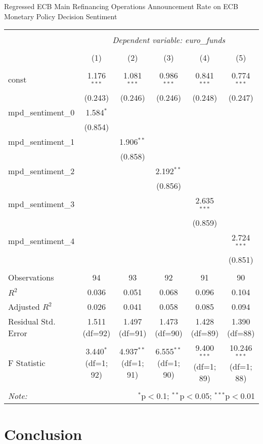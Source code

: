 \documentclass[12pt, letterpaper]{article}
\begin{document}
 Regressed ECB Main Refinancing Operations Announcement Rate on ECB Monetary Policy Decision Sentiment

\begin{table}[H] 
\begin{adjustbox}{width=\textwidth}
\centering
\begin{tabular}{@{\extracolsep{5pt}}lccccc}
\\[-1.8ex]\hline
\hline \\[-1.8ex]
& \multicolumn{5}{c}{\textit{Dependent variable: euro\_funds}} \\
\cline{2-6}
\\[-1.8ex] & (1) & (2) & (3) & (4) & (5) \\
\hline \\[-1.8ex]
const & 1.176$^{***}$ & 1.081$^{***}$ & 0.986$^{***}$ & 0.841$^{***}$ & 0.774$^{***}$ \\
& (0.243) & (0.246) & (0.246) & (0.248) & (0.247) \\
mpd\_sentiment\_0 & 1.584$^{*}$ & & & & \\
& (0.854) & & & & \\
mpd\_sentiment\_1 & & 1.906$^{**}$ & & & \\
& & (0.858) & & & \\
mpd\_sentiment\_2 & & & 2.192$^{**}$ & & \\
& & & (0.856) & & \\
mpd\_sentiment\_3 & & & & 2.635$^{***}$ & \\
& & & & (0.859) & \\
mpd\_sentiment\_4 & & & & & 2.724$^{***}$ \\
& & & & & (0.851) \\
\hline \\[-1.8ex]
Observations & 94 & 93 & 92 & 91 & 90 \\
$R^2$ & 0.036 & 0.051 & 0.068 & 0.096 & 0.104 \\
Adjusted $R^2$ & 0.026 & 0.041 & 0.058 & 0.085 & 0.094 \\
Residual Std. Error & 1.511 (df=92) & 1.497 (df=91) & 1.473 (df=90) & 1.428 (df=89) & 1.390 (df=88) \\
F Statistic & 3.440$^{*}$ (df=1; 92) & 4.937$^{**}$ (df=1; 91) & 6.555$^{**}$ (df=1; 90) & 9.400$^{***}$ (df=1; 89) & 10.246$^{***}$ (df=1; 88) \\
\hline
\hline \\[-1.8ex]
\textit{Note:} & \multicolumn{5}{r}{$^{*}$p$<$0.1; $^{**}$p$<$0.05; $^{***}$p$<$0.01} \\
\end{tabular}
\end{adjustbox}
\end{table}


\section{Conclusion}
\end{document}
